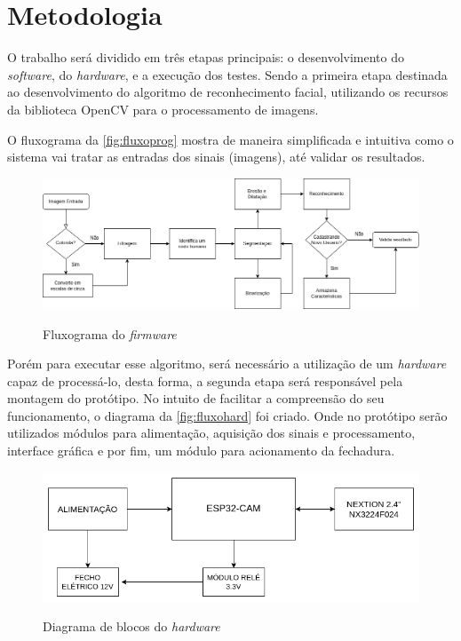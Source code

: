 
\chapter{Metodologia}\label{cap:materialemetodos}

O trabalho será dividido em três etapas principais: o desenvolvimento do \textit{software}, 
do \textit{hardware}, e a execução dos testes. Sendo a primeira etapa 
destinada ao desenvolvimento do algoritmo de reconhecimento facial, utilizando os 
recursos da biblioteca OpenCV para o processamento de imagens.

O fluxograma da \autoref{fig:fluxoprog} mostra de maneira simplificada e intuitiva
como o sistema vai tratar as entradas dos sinais (imagens), até validar os resultados.

\begin{figure}[h!]
    \centering
    \caption{Fluxograma do \textit{firmware}}
    \includegraphics[scale=0.4]{figuras/fluxo_programa.png} 
    \fonte{}%
    \label{fig:fluxoprog}
    \centering
\end{figure}

Porém para executar esse algoritmo, será necessário a utilização de um \textit{hardware} 
capaz de processá-lo, desta forma, a segunda etapa será responsável pela montagem 
do protótipo. No intuito de facilitar a compreensão do seu funcionamento, o diagrama da 
\autoref{fig:fluxohard} foi criado. Onde no protótipo serão utilizados módulos para alimentação, 
aquisição dos sinais e processamento, interface gráfica e por fim, um módulo para 
acionamento da fechadura.

\begin{figure}[h!]
    \centering
    \caption{Diagrama de blocos do \textit{hardware}}
    \includegraphics[scale=0.4]{figuras/fluxo_hardware.png} 
    \fonte{}%
    \label{fig:fluxohard}
    \centering
\end{figure}

